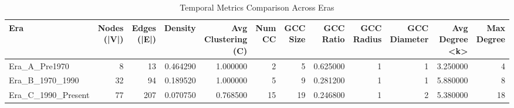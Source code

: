 \begin{table}
\caption{Temporal Metrics Comparison Across Eras}
\label{tab:temporal_metrics}
\begin{tabular}{lrrrrrrrrrrr}
\toprule
Era & Nodes (|V|) & Edges (|E|) & Density & Avg Clustering (C) & Num CC & GCC Size & GCC Ratio & GCC Radius & GCC Diameter & Avg Degree <k> & Max Degree \\
\midrule
Era_A_Pre1970 & 8 & 13 & 0.464290 & 1.000000 & 2 & 5 & 0.625000 & 1 & 1 & 3.250000 & 4 \\
Era_B_1970_1990 & 32 & 94 & 0.189520 & 1.000000 & 5 & 9 & 0.281200 & 1 & 1 & 5.880000 & 8 \\
Era_C_1990_Present & 77 & 207 & 0.070750 & 0.768500 & 15 & 19 & 0.246800 & 1 & 2 & 5.380000 & 18 \\
\bottomrule
\end{tabular}
\end{table}
